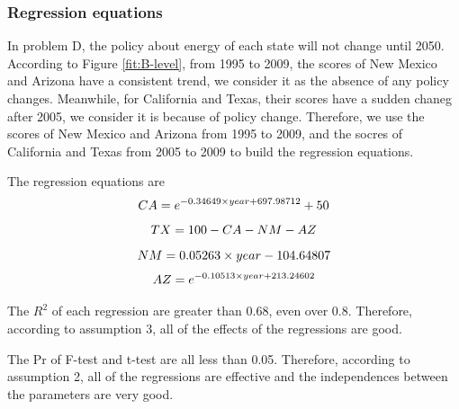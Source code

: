 \documentclass[a4paper,11pt]{article}
\begin{document}
\subsubsection{Regression equations}
\par In problem D, the policy about energy of each state will not change until 2050. According to Figure \ref{fit:B-level}, from 1995 to 2009, the scores of New Mexico and Arizona have a consistent trend, we consider it as the absence of any policy changes. Meanwhile, for California and Texas, their scores have a sudden chaneg after 2005, we consider it is because of policy change. Therefore, we use the scores of New Mexico and Arizona from 1995 to 2009, and the socres of California and Texas from 2005 to 2009 to build the regression equations.
\par The regression equations are
\begin{equation}
    \centering
CA=e^{-0.34649 \times year+697.98712}+50
\end{equation}
\begin{equation}
    \centering
TX=100-CA-NM-AZ
\end{equation}
\begin{equation}
    \centering
NM=0.05263 \times year-104.64807
\end{equation}
\begin{equation}
    \centering
AZ=e^{-0.10513 \times year+213.24602}
\end{equation}
\par The $R^{2}$ of each regression are greater than 0.68, even over 0.8. Therefore, according to assumption 3, all of the effects of the regressions are good.
\par The Pr of F-test and t-test are all less than 0.05. Therefore, according to assumption 2, all of the regressions are effective and the independences between the parameters are very good.
\end{document}
